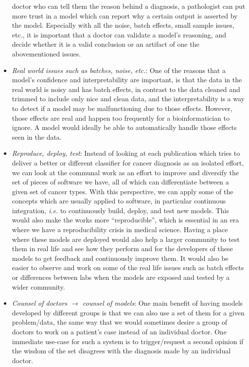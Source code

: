 \begin{itemize}
    doctor who can tell them the reason behind a diagnosis, a pathologist can
    put more trust in a model which can report why a certain output is asserted
    by the model. Especially with all the noise, batch effects, small sample
    issues, etc., it is important that a doctor can validate a model's
    reasoning, and decide whether it is a valid conclusion or an artifact of
    one the abovementioned issues.
  \item \emph{Real world issues such as batches, noise, etc.}: One of the
    reasons that a model's confidence and interpretability are important, is
    that the data in the real world is noisy and has batch effects, in contrast
    to the data cleaned and trimmed to include only nice and clean data, and
    the interpretability is a way to detect if a model may be malfunctioning
    due to those effects. However, those effects are real and happen too
    frequently for a bioinformatician to ignore. A model would ideally be able
    to automatically handle those effects seen in the data.
  \item \emph{Reproduce, deploy, test}: Instead of looking at each publication
    which tries to deliver a better or different classifier for cancer
    diagnosis as an isolated effort, we can look at the communal work as an
    effort to improve and diversify the set of pieces of software we have, all
    of which can differentiate between a given set of cancer types. With this
    perspective, we can apply some of the concepts which are usually applied to
    software, in particular continuous integration, \emph{i.e.} to continuously
    build, deploy, and test new models. This would also make the works more
    ``reproducible'', which is essential in an era where we have a
    reproducibility crisis in medical science. Having a place where these
    models are deployed would also help a larger community to test them in real
    life and see how they perform and for the developers of these models to get
    feedback and continuously improve them. It would also be easier to observe
    and work on some of the real life issues such as batch effects or
    differences between labs when the models are exposed and tested by a wider
    community.
  \item \emph{Counsel of doctors $\rightarrow$ counsel of models}: One main
    benefit of having models developed by different groups is that we can also
    use a set of them for a given problem/data, the same way that we would
    sometimes desire a group of doctors to work on a patient's case instead of
    an individual doctor. One immediate use-case for such a system is to
    trigger/request a second opinion if the wisdom of the set disagrees with
    the diagnosis made by an individual doctor.
\end{itemize}

